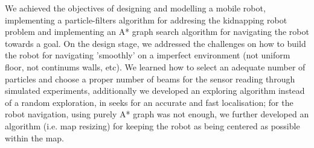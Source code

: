 We achieved the objectives of designing and modelling a mobile robot, implementing a particle-filters algorithm for addresing the kidnapping robot problem and implementing an A* graph search algorithm for navigating the robot towards a goal. On the design stage, we addressed the challenges on how to build the robot for navigating  'smoothly' on a imperfect environment (not uniform floor, not continums walls, etc). We learned how to select an adequate number of particles and choose a proper number of beams for the sensor reading through simulated experiments, additionally we developed an exploring algorithm instead of a random exploration, in seeks for an accurate and fast localisation; for the robot navigation, using purely A* graph was not enough, we further developed an algorithm (i.e. map resizing) for keeping the robot as being centered as possible within the map.

